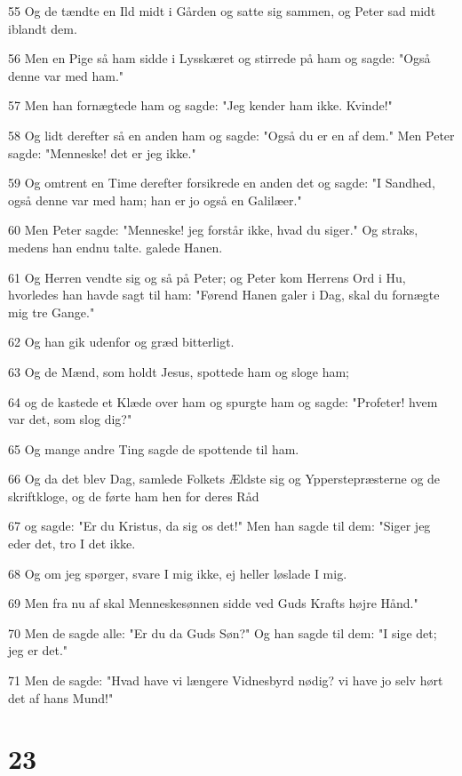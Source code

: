 \par 55 Og de tændte en Ild midt i Gården og satte sig sammen, og Peter sad midt iblandt dem.
\par 56 Men en Pige så ham sidde i Lysskæret og stirrede på ham og sagde: "Også denne var med ham."
\par 57 Men han fornægtede ham og sagde: "Jeg kender ham ikke. Kvinde!"
\par 58 Og lidt derefter så en anden ham og sagde: "Også du er en af dem." Men Peter sagde: "Menneske! det er jeg ikke."
\par 59 Og omtrent en Time derefter forsikrede en anden det og sagde: "I Sandhed, også denne var med ham; han er jo også en Galilæer."
\par 60 Men Peter sagde: "Menneske! jeg forstår ikke, hvad du siger." Og straks, medens han endnu talte. galede Hanen.
\par 61 Og Herren vendte sig og så på Peter; og Peter kom Herrens Ord i Hu, hvorledes han havde sagt til ham: "Førend Hanen galer i Dag, skal du fornægte mig tre Gange."
\par 62 Og han gik udenfor og græd bitterligt.
\par 63 Og de Mænd, som holdt Jesus, spottede ham og sloge ham;
\par 64 og de kastede et Klæde over ham og spurgte ham og sagde: "Profeter! hvem var det, som slog dig?"
\par 65 Og mange andre Ting sagde de spottende til ham.
\par 66 Og da det blev Dag, samlede Folkets Ældste sig og Ypperstepræsterne og de skriftkloge, og de førte ham hen for deres Råd
\par 67 og sagde: "Er du Kristus, da sig os det!" Men han sagde til dem: "Siger jeg eder det, tro I det ikke.
\par 68 Og om jeg spørger, svare I mig ikke, ej heller løslade I mig.
\par 69 Men fra nu af skal Menneskesønnen sidde ved Guds Krafts højre Hånd."
\par 70 Men de sagde alle: "Er du da Guds Søn?" Og han sagde til dem: "I sige det; jeg er det."
\par 71 Men de sagde: "Hvad have vi længere Vidnesbyrd nødig? vi have jo selv hørt det af hans Mund!"

\chapter{23}

